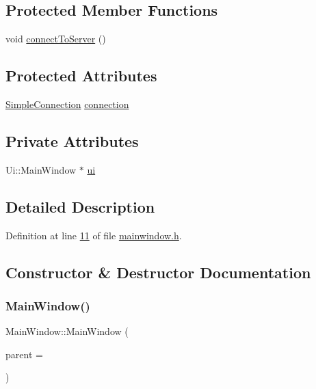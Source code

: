 \subsection*{Protected Member Functions}
\begin{DoxyCompactItemize}
\item 
void \hyperlink{a00177_abfedef9edae209df536e8c1c7cf0e7ae}{connect\+To\+Server} ()
\end{DoxyCompactItemize}
\subsection*{Protected Attributes}
\begin{DoxyCompactItemize}
\item 
\hyperlink{a00125}{Simple\+Connection} \hyperlink{a00177_a8235680bc39bc64e5686dfcaccabf72f}{connection}
\end{DoxyCompactItemize}
\subsection*{Private Attributes}
\begin{DoxyCompactItemize}
\item 
Ui\+::\+Main\+Window $\ast$ \hyperlink{a00177_a35466a70ed47252a0191168126a352a5}{ui}
\end{DoxyCompactItemize}


\subsection{Detailed Description}


Definition at line \hyperlink{a00083_source_l00011}{11} of file \hyperlink{a00083_source}{mainwindow.\+h}.



\subsection{Constructor \& Destructor Documentation}
\mbox{\label{a00177_a8b244be8b7b7db1b08de2a2acb9409db}} 
\subsubsection{\texorpdfstring{Main\+Window()}{MainWindow()}}
{\footnotesize\ttfamily Main\+Window\+::\+Main\+Window (\begin{DoxyParamCaption}\item[{Q\+Widget $\ast$}]{parent = {} }\end{DoxyParamCaption})\hspace{0.3cm}{\ttfamily [explicit]}}



